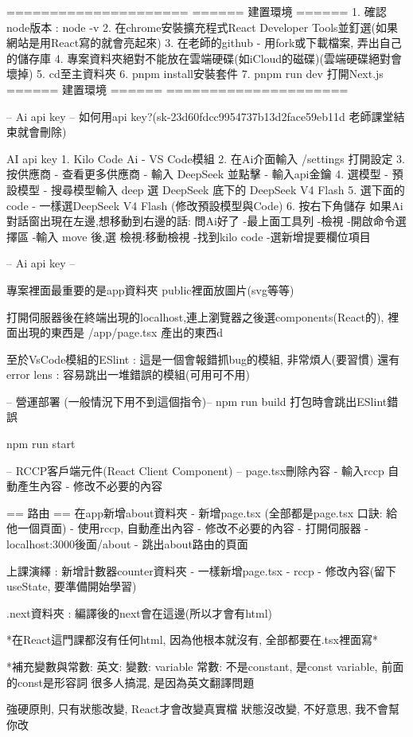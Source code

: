 =====================
====== 建置環境 ======
1. 確認node版本 : node -v
2. 在chrome安裝擴充程式React Developer Tools並釘選(如果網站是用React寫的就會亮起來)
3. 在老師的github - 用fork或下載檔案, 弄出自己的儲存庫
4. 專案資料夾絕對不能放在雲端硬碟(如iCloud的磁碟)(雲端硬碟絕對會壞掉)
5. cd至主資料夾
6. pnpm install安裝套件
7. pnpm run dev 打開Next.js
====== 建置環境 ======
=====================

-- Ai api key --
如何用api key?(sk-23d60fdcc9954737b13d2face59eb11d 老師課堂結束就會刪除)

AI api key
1. Kilo Code Ai - VS Code模組
2. 在Ai介面輸入 /settings 打開設定
3. 按供應商 - 查看更多供應商 - 輸入 DeepSeek 並點擊 - 輸入api金鑰
4. 選模型 - 預設模型 - 搜尋模型輸入 deep 選 DeepSeek 底下的 DeepSeek V4 Flash
5. 選下面的code - 一樣選DeepSeek V4 Flash (修改預設模型與Code)
6. 按右下角儲存
如果Ai對話窗出現在左邊,想移動到右邊的話:
問Ai好了
-最上面工具列
-檢視
-開啟命令選擇區 
-輸入 move 後,選 檢視:移動檢視 
-找到kilo code 
-選新增提要欄位項目

-- Ai api key --

專案裡面最重要的是app資料夾
public裡面放圖片(svg等等)

打開伺服器後在終端出現的localhost,連上瀏覽器之後選components(React的), 裡面出現的東西是 /app/page.tsx 產出的東西d

至於VsCode模組的ESlint : 這是一個會報錯抓bug的模組, 非常煩人(要習慣)
還有error lens : 容易跳出一堆錯誤的模組(可用可不用)


-- 營運部署 (一般情況下用不到這個指令)--
npm run build
打包時會跳出ESlint錯誤

npm run start


-- RCCP客戶端元件(React Client Component) --
page.tsx刪除內容
- 輸入rccp 自動產生內容
- 修改不必要的內容

== 路由 ==
在app新增about資料夾
- 新增page.tsx (全部都是page.tsx  口訣: 給他一個頁面)
- 使用rccp, 自動產出內容
- 修改不必要的內容
- 打開伺服器
- localhost:3000後面/about
- 跳出about路由的頁面

上課演繹 :
新增計數器counter資料夾
- 一樣新增page.tsx
- rccp
- 修改內容(留下useState, 要準備開始學習)

.next資料夾 : 編譯後的next會在這邊(所以才會有html)

*在React這門課都沒有任何html, 因為他根本就沒有, 全部都要在.tsx裡面寫*

*補充變數與常數:
英文:
變數: variable
常數: 不是constant,
是const variable, 前面的const是形容詞
很多人搞混, 是因為英文翻譯問題

強硬原則, 只有狀態改變, React才會改變真實檔
狀態沒改變, 不好意思, 我不會幫你改


